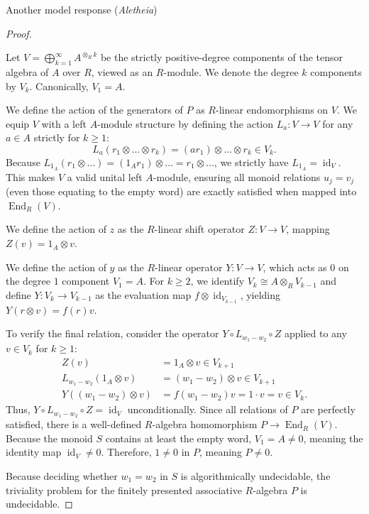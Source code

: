 \documentclass{article}
\theoremstyle{plain}
\theoremstyle{definition}
\begin{document}
\begin{solution}{Another model response (\emph{Aletheia})}
\begin{proof}
\begin{itemize}
    Let $V = \bigoplus_{k=1}^\infty A^{\otimes_R k}$ be the strictly positive-degree components of the tensor algebra of $A$ over $R$, viewed as an $R$-module. We denote the degree $k$ components by $V_k$. Canonically, $V_1 = A$.

    We define the action of the generators of $P$ as $R$-linear endomorphisms on $V$. We equip $V$ with a left $A$-module structure by defining the action $L_a : V \to V$ for any $a \in A$ strictly for $k \ge 1$:
    \[
        L_a(r_1 \otimes \dots \otimes r_k) = (a r_1) \otimes \dots \otimes r_k \in V_k.
    \]
    Because $L_{1_A}(r_1 \otimes \dots) = (1_A r_1) \otimes \dots = r_1 \otimes \dots$, we strictly have $L_{1_A} = \operatorname{id}_V$. This makes $V$ a valid unital left $A$-module, ensuring all monoid relations $u_j = v_j$ (even those equating to the empty word) are exactly satisfied when mapped into $\operatorname{End}_R(V)$.

    We define the action of $z$ as the $R$-linear shift operator $Z: V \to V$, mapping $Z(v) = 1_A \otimes v$.

    We define the action of $y$ as the $R$-linear operator $Y: V \to V$, which acts as $0$ on the degree $1$ component $V_1 = A$. For $k \ge 2$, we identify $V_k \cong A \otimes_R V_{k-1}$ and define $Y: V_k \to V_{k-1}$ as the evaluation map $f \otimes \operatorname{id}_{V_{k-1}}$, yielding $Y(r \otimes v) = f(r)v$.

    To verify the final relation, consider the operator $Y \circ L_{w_1 - w_2} \circ Z$ applied to any $v \in V_k$ for $k \ge 1$:
    \begin{align*}
        Z(v) &= 1_A \otimes v \in V_{k+1}\\
        L_{w_1 - w_2} (1_A \otimes v) &= (w_1 - w_2) \otimes v \in V_{k+1}\\
        Y((w_1 - w_2) \otimes v) &= f(w_1 - w_2) v = 1 \cdot v = v \in V_k.
    \end{align*}
    Thus, $Y \circ L_{w_1 - w_2} \circ Z = \operatorname{id}_V$ unconditionally. Since all relations of $P$ are perfectly satisfied, there is a well-defined $R$-algebra homomorphism $P \to \operatorname{End}_R(V)$. Because the monoid $S$ contains at least the empty word, $V_1 = A \neq 0$, meaning the identity map $\operatorname{id}_V \neq 0$. Therefore, $1 \neq 0$ in $P$, meaning $P \neq 0$.
\end{itemize}

Because deciding whether $w_1 = w_2$ in $S$ is algorithmically undecidable, the triviality problem for the finitely presented associative $R$-algebra $P$ is undecidable.


\end{proof}
\end{solution}
\end{document}
